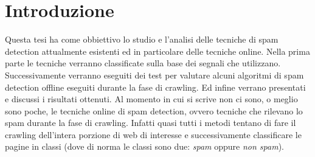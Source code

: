 \chapter{Introduzione}

Questa tesi ha come obbiettivo lo studio e l'analisi delle tecniche di spam detection attualmente esistenti ed in particolare delle tecniche online. Nella prima parte le tecniche verranno classificate sulla base dei segnali che utilizzano. Successivamente verranno eseguiti dei test per valutare alcuni algoritmi di spam detection offline eseguiti durante la fase di crawling. Ed infine verrano presentati e discussi i risultati ottenuti. Al momento in cui si scrive non ci sono, o meglio sono poche, le tecniche online di spam detection, ovvero tecniche che rilevano lo spam durante la fase di crawling. Infatti quasi tutti i metodi tentano di fare il crawling dell'intera porzione di web di interesse e successivamente classificare le pagine in classi (dove di norma le classi sono due: \textit{spam} oppure \textit{non spam}).

